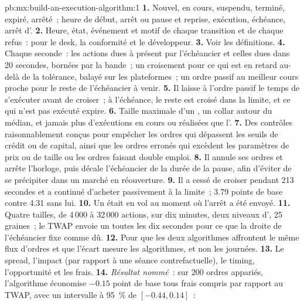 \begin{solution}{pb:mx:build-an-execution-algorithm:1}
\textbf{1.} Nouvel, en cours, suspendu, terminé, expiré, arrêté~; heure de début, arrêt ou pause et reprise, exécution, échéance, arrêt d'.
\textbf{2.} Heure, état, événement et motif de chaque transition et de chaque refus~: pour le desk, la conformité et le développeur.
\textbf{3.} Voir les définitions.
\textbf{4.} Chaque seconde~: les actions dues à présent par l'échéancier et celles dues dans 20 secondes, bornées par la bande~; un croisement pour ce qui est en retard au-delà de la tolérance,
balayé sur les plateformes~; un ordre passif au meilleur cours proche pour le reste de l'échéancier à venir.
\textbf{5.} Il laisse à l'ordre passif le temps de s'exécuter avant de croiser~; à l'échéance, le reste est croisé dans la limite, et ce qui n'est pas
exécuté expire.
\textbf{6.} Taille maximale d'un , un collar autour du médian, et jamais plus d'exécutions en cours ou réalisées que l'.
\textbf{7.} Des contrôles raisonnablement conçus pour empêcher les ordres qui dépassent les seuils de crédit ou de capital, ainsi que les ordres erronés qui excèdent les paramètres de prix ou de taille
ou les ordres faisant double emploi.
\textbf{8.} Il annule ses ordres et arrête l'horloge, puis décale l'échéancier de la durée de la pause, afin d'éviter de se précipiter dans un marché en réouverture.
\textbf{9.} Il a cessé de croiser pendant 213 secondes et a continué d'acheter passivement à la limite~; 3.79 points de base contre 4.31 sans lui.
\textbf{10.} Un  était en vol au moment où l'arrêt a été envoyé.
\textbf{11.} Quatre tailles, de 4\,000 à 32\,000 actions, sur dix minutes, deux niveaux d', 25 graines~; le TWAP envoie un  toutes les dix secondes pour ce que la droite de l'échéancier
fixe comme dû.
\textbf{12.} Pour que les deux algorithmes affrontent le même flux d'ordres et que l'écart mesure les algorithmes, et non les journées.
\textbf{13.} Le spread, l'impact (par rapport à une séance contrefactuelle), le timing, l'opportunité et les frais.
\textbf{14.} \emph{Résultat nommé}~: sur 200 ordres appariés, l'algorithme économise $-0.15$ point de base tous frais compris par rapport au TWAP, avec un intervalle à 95~\% de $[-0.44, 0.14]$~:

\end{solution}
